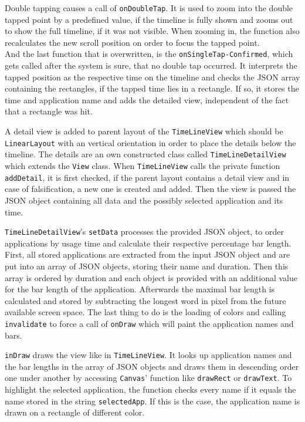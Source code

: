 Double  tapping causes a call of \lstinline$onDoubleTap$. It is used to zoom into the double tapped point by a predefined value, if the timeline is fully shown and zooms out to show the full timeline, if it was not visible. When zooming in, the function also recalculates the new scroll position on order to focus the tapped point.\\
And  the last function that is overwritten, is the \lstinline$onSingleTap-Confirmed$, which gets called after the system is sure, that no double tap occurred. It interprets the tapped position as the respective time on the timeline and checks the JSON array containing the rectangles, if the tapped time lies in a rectangle. If so, it stores the time and application name and adds the detailed view, independent of the fact that a rectangle was hit.

A  detail view is added to parent layout of the \lstinline$TimeLineView$ which should be \lstinline$LinearLayout$ with an vertical orientation in order to place the details below the timeline. The details are an own constructed class called \lstinline$TimeLineDetailView$ which extends the \lstinline$View$ class. When \lstinline$TimeLineView$ calls the private function \lstinline$addDetail$, it is first checked, if the parent layout contains a detail view and in case of falsification, a new one is created and added. Then the view is passed the JSON object containing all data and the possibly selected application and its time.

\lstinline$TimeLineDetailView$'s  \lstinline$setData$ processes the provided JSON object, to order applications by usage time and calculate their respective percentage bar length. First, all stored applications are extracted from the input JSON object and are put into an array of JSON objects, storing their name and duration. Then this array is ordered by duration and each object is provided with an additional value for the bar length of the application. Afterwards the maximal bar length is calculated and stored by subtracting the longest word in pixel from the future available screen space. The last thing to do is the loading of colors and calling \lstinline$invalidate$ to force a call of \lstinline$onDraw$ which will paint the application names and bars.

\lstinline$inDraw$  draws the view like in \lstinline$TimeLineView$. It looks up application names and the bar lengths in the array of JSON objects and draws them in descending order one under another by accessing \lstinline$Canvas$' function like \lstinline$drawRect$ or \lstinline$drawText$. To highlight the selected application, the function checks every name if it equals the name stored in the string \lstinline$selectedApp$. If this is the case, the application name is drawn on a rectangle of different color.


